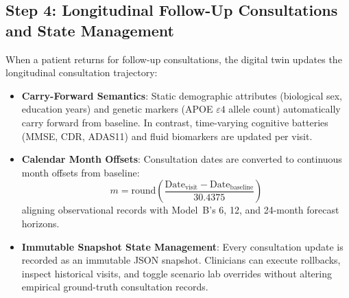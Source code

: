 \documentclass[11pt,a4paper]{article}
\begin{document}
\subsection{Step 4: Longitudinal Follow-Up Consultations and State Management}
\label{sec:method_followup}
When a patient returns for follow-up consultations, the digital twin updates the longitudinal consultation trajectory:
\begin{itemize}
    \item \textbf{Carry-Forward Semantics}: Static demographic attributes (biological sex, education years) and genetic markers (APOE $\varepsilon4$ allele count) automatically carry forward from baseline. In contrast, time-varying cognitive batteries (MMSE, CDR, ADAS11) and fluid biomarkers are updated per visit.
    \item \textbf{Calendar Month Offsets}: Consultation dates are converted to continuous month offsets from baseline:
    \begin{equation}
        m = \text{round}\left(\frac{\text{Date}_{\text{visit}} - \text{Date}_{\text{baseline}}}{30.4375}\right)
        \label{eq:month_offset}
    \end{equation}
    aligning observational records with Model~B's 6, 12, and 24-month forecast horizons.
    \item \textbf{Immutable Snapshot State Management}: Every consultation update is recorded as an immutable JSON snapshot. Clinicians can execute rollbacks, inspect historical visits, and toggle scenario lab overrides without altering empirical ground-truth consultation records.
\end{itemize}
\end{document}
